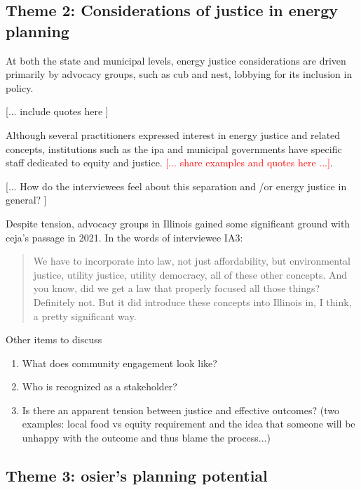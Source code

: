 \subsection{Theme 2: Considerations of justice in energy planning}

At both the state and municipal levels, energy justice considerations are driven
primarily by advocacy groups, such as \ac{cub} and \ac{nest}, lobbying for its
inclusion in policy. 

[... include quotes here ]

Although several practitioners expressed interest in energy justice and related
concepts, institutions such as the \ac{ipa} and municipal governments have
specific staff dedicated to equity and justice. \textcolor{red}{[... share
examples and quotes here ...]}. 

[... How do the interviewees feel about this separation and /or energy justice
in general? ]

Despite tension, advocacy groups in Illinois gained some significant ground with
\ac{ceja}'s passage in 2021. In the words of interviewee IA3:

\begin{quote}
    We have to incorporate into law, not just affordability, but environmental
    justice, utility justice, utility democracy, all of these other concepts.
    And you know, did we get a law that properly focused all those things?
    Definitely not. But it did introduce these concepts into Illinois in, I
    think, a pretty significant way.
\end{quote}

Other items to discuss
\begin{enumerate}
    \item What does community engagement look like?
    \item Who is recognized as a stakeholder?
    \item Is there an apparent tension between justice and effective outcomes?
    (two examples: local food vs equity requirement and the idea that someone
    will be unhappy with the outcome and thus blame the process...)
\end{enumerate}


\subsection{Theme 3: \ac{osier}'s planning potential}


